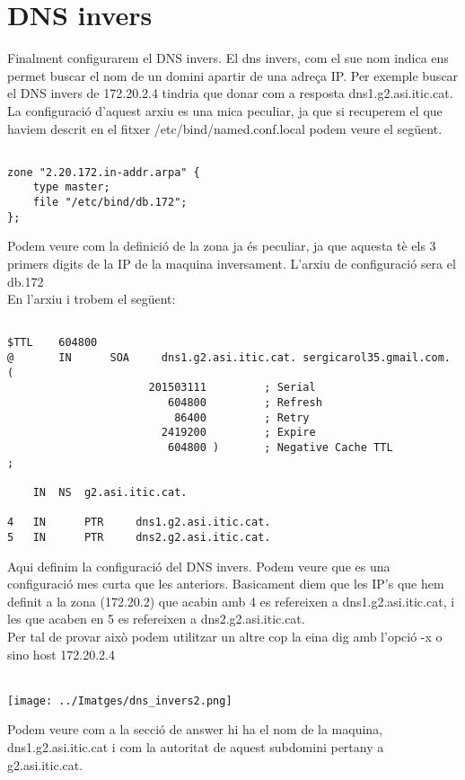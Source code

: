 \documentclass[11p]{article}
\begin{document}
\section{DNS invers}

Finalment configurarem el DNS invers. El dns invers, com el sue nom indica ens permet buscar el nom de un domini apartir de una adreça IP. Per exemple buscar el DNS invers de 172.20.2.4 tindria que donar com a resposta dns1.g2.asi.itic.cat. La configuració d'aquest arxiu es una mica peculiar, ja que si recuperem el que haviem descrit en el fitxer /etc/bind/named.conf.local podem veure el següent.
\begin{lstlisting}
	
zone "2.20.172.in-addr.arpa" {
	type master;
	file "/etc/bind/db.172";
};

\end{lstlisting}

Podem veure com la definició de la zona ja és peculiar, ja que aquesta tè els 3 primers digits de la IP de la maquina inversament. L'arxiu de configuració sera el db.172\\
En l'arxiu i trobem el següent: 
\newpage 
\begin{lstlisting}
	
$TTL    604800
@       IN      SOA     dns1.g2.asi.itic.cat. sergicarol35.gmail.com. (
                      201503111         ; Serial
                         604800         ; Refresh
                          86400         ; Retry
                        2419200         ; Expire
                         604800 )       ; Negative Cache TTL
;

	IN	NS 	g2.asi.itic.cat.

4 	IN      PTR     dns1.g2.asi.itic.cat.
5	IN	    PTR		dns2.g2.asi.itic.cat.

\end{lstlisting}

Aqui definim la configuració del DNS invers. Podem veure que es una configuració mes curta que les anteriors. Basicament diem que les IP's que hem definit a la zona (172.20.2) que acabin amb 4 es refereixen a dns1.g2.asi.itic.cat, i les que acaben en 5 es refereixen a dns2.g2.asi.itic.cat.\\
Per tal de provar això podem utilitzar un altre cop la eina dig amb l'opció -x o sino host 172.20.2.4 \\\\

\centerline{\texttt{[image: ../Imatges/dns\_invers2.png]} }
Podem veure com a la secció de answer hi ha el nom de la maquina, dns1.g2.asi.itic.cat i com la autoritat de aquest subdomini pertany a g2.asi.itic.cat.
\end{document}
